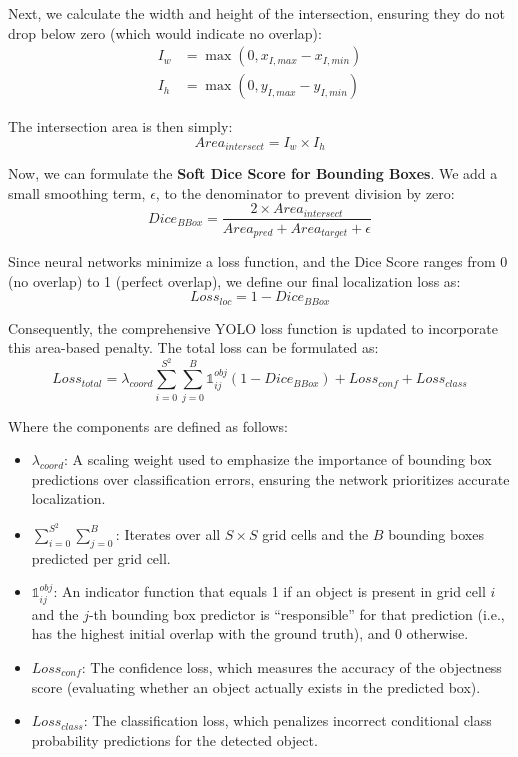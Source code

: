 \documentclass{article}
\begin{document}
Next, we calculate the width and height of the intersection, ensuring they do not drop below zero (which would indicate no overlap):
\begin{align}
I_w &= \max(0, x_{I, max} - x_{I, min}) \\
I_h &= \max(0, y_{I, max} - y_{I, min})
\end{align}

The intersection area is then simply:
\begin{equation}
Area_{intersect} = I_w \times I_h
\end{equation}

Now, we can formulate the \textbf{Soft Dice Score for Bounding Boxes}. We add a small smoothing term, $\epsilon$, to the denominator to prevent division by zero:
\begin{equation}
Dice_{BBox} = \frac{2 \times Area_{intersect}}{Area_{pred} + Area_{target} + \epsilon}
\end{equation}

Since neural networks minimize a loss function, and the Dice Score ranges from 0 (no overlap) to 1 (perfect overlap), we define our final localization loss as:
\begin{equation}
Loss_{loc} = 1 - Dice_{BBox}
\end{equation}

Consequently, the comprehensive YOLO loss function is updated to incorporate this area-based penalty. The total loss can be formulated as:
\begin{equation}
Loss_{total} = \lambda_{coord} \sum_{i=0}^{S^2} \sum_{j=0}^{B} \mathbb{1}_{ij}^{obj} (1 - Dice_{BBox}) + Loss_{conf} + Loss_{class}
\end{equation}


Where the components are defined as follows:
\begin{itemize}
	\item $\lambda_{coord}$: A scaling weight used to emphasize the importance of bounding box predictions over classification errors, ensuring the network prioritizes accurate localization.
	\item $\sum_{i=0}^{S^2} \sum_{j=0}^{B}$: Iterates over all $S \times S$ grid cells and the $B$ bounding boxes predicted per grid cell.
	\item $\mathbb{1}_{ij}^{obj}$: An indicator function that equals 1 if an object is present in grid cell $i$ and the $j$-th bounding box predictor is ``responsible'' for that prediction (i.e., has the highest initial overlap with the ground truth), and 0 otherwise.
	\item $Loss_{conf}$: The confidence loss, which measures the accuracy of the objectness score (evaluating whether an object actually exists in the predicted box).
	\item $Loss_{class}$: The classification loss, which penalizes incorrect conditional class probability predictions for the detected object.
\end{itemize}
\end{document}
